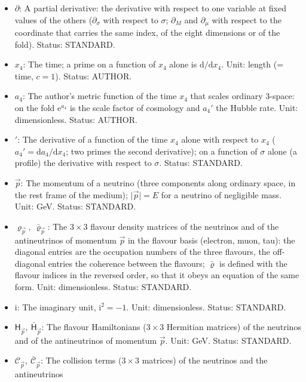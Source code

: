 \documentclass[
  10pt,
]{article}
\providecommand{\tightlist}{%
  \setlength{\itemsep}{0pt}\setlength{\parskip}{0pt}}
\begin{document}
\begin{itemize}
\tightlist
\item
  \(\partial\): A partial derivative: the derivative with respect to one
  variable at fixed values of the others (\(\partial_\sigma\) with
  respect to \(\sigma\); \(\partial_M\) and \(\partial_\mu\) with
  respect to the coordinate that carries the same index, of the eight
  dimensions or of the fold). Status: STANDARD.
\item
  \(x_4\): The time; a prime on a function of \(x_4\) alone is
  \(\mathrm{d}/\mathrm{d}x_4\). Unit: length (= time, \(c = 1\)).
  Status: AUTHOR.
\item
  \(a_4\): The author's metric function of the time \(x_4\) that scales
  ordinary 3-space: on the fold \(\mathrm{e}^{a_4}\) is the scale factor
  of cosmology and \(a_4'\) the Hubble rate. Unit: dimensionless.
  Status: AUTHOR.
\item
  \({}'\): The derivative of a function of the time \(x_4\) alone with
  respect to \(x_4\) (\(a_4' = \mathrm{d}a_4/\mathrm{d}x_4\); two primes
  the second derivative); on a function of \(\sigma\) alone (a profile)
  the derivative with respect to \(\sigma\). Status: STANDARD.
\item
  \(\vec p\): The momentum of a neutrino (three components along
  ordinary space, in the rest frame of the medium);
  \(\lvert\vec p\rvert = E\) for a neutrino of negligible mass. Unit:
  GeV. Status: STANDARD.
\item
  \(\varrho_{\vec p},\ \bar\varrho_{\vec p}\): The \(3 \times 3\)
  flavour density matrices of the neutrinos and of the antineutrinos of
  momentum \(\vec p\) in the flavour basis (electron, muon, tau): the
  diagonal entries are the occupation numbers of the three flavours, the
  off-diagonal entries the coherence between the flavours;
  \(\bar\varrho\) is defined with the flavour indices in the reversed
  order, so that it obeys an equation of the same form. Unit:
  dimensionless. Status: STANDARD.
\item
  \(\mathrm{i}\): The imaginary unit, \(\mathrm{i}^2 = -1\). Unit:
  dimensionless. Status: STANDARD.
\item
  \(\mathsf{H}_{\vec p},\ \bar{\mathsf{H}}_{\vec p}\): The flavour
  Hamiltonians (\(3 \times 3\) Hermitian matrices) of the neutrinos and
  of the antineutrinos of momentum \(\vec p\). Unit: GeV. Status:
  STANDARD.
\item
  \(\mathcal{C}_{\vec p},\ \bar{\mathcal{C}}_{\vec p}\): The collision
  terms (\(3 \times 3\) matrices) of the neutrinos and the antineutrinos

\end{itemize}
\end{document}
